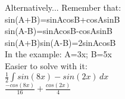 \documentclass{article}
\begin{document}
\begin{enumerate}
\begin{enumerate}
        Alternatively... Remember that:\\
        sin(A+B)=sinAcosB+cosAsinB\\
        sin(A-B)=sinAcosB-cosAsinB\\
        sin(A+B)sin(A-B)=2sinAcosB\\
        In the example: A=3x; B=5x\\
        Easier to solve with it:\\
        $\frac{1}{2}\int sin(8x)-sin(2x) \,dx$\\
        $\frac{-cos(8x)}{16}+\frac{cos(2x)}{4}$\\
    \end{enumerate}
\end{enumerate}
\end{document}
